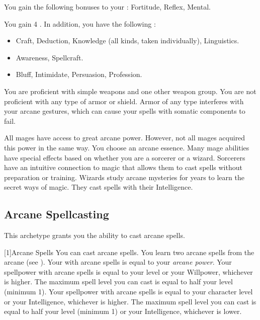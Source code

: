         You gain the following bonuses to your :  Fortitude,  Reflex,  Mental.

        You gain 4 .
        In addition, you have the following :
        \begin{itemize}
            \item {} Craft, Deduction, Knowledge (all kinds, taken individually), Linguistics.
            \item {} Awareness, Spellcraft.
            \item {} Bluff, Intimidate, Persuasion, Profession.
        \end{itemize}

        You are proficient with simple weapons and one other weapon group.
        You are not proficient with any type of armor or shield.
        Armor of any type interferes with your arcane gestures, which can cause your spells with somatic components to fail.

        All mages have access to great arcane power.
        However, not all mages acquired this power in the same way.
        You choose an arcane essence.
        Many mage abilities have special effects based on whether you are a sorcerer or a wizard.
         Sorcerers have an intuitive connection to magic that allows them to cast spells without preparation or training.
         Wizards study arcane mysteries for years to learn the secret ways of magic.
        They cast spells with their Intelligence.

    \subsection{Arcane Spellcasting}
        This archetype grants you the ability to cast arcane spells.

        [1]{Arcane Spells}
        You can cast arcane spells.
        You learn two arcane spells from the arcane  (see ).
        Your  with arcane spells is equal to your \textit{arcane power}.
         Your spellpower with arcane spells is equal to your level or your Willpower, whichever is higher.
        The maximum spell level you can cast is equal to half your level (minimum 1).
         Your spellpower with arcane spells is equal to your character level or your Intelligence, whichever is higher.
        The maximum spell level you can cast is equal to half your level (minimum 1) or your Intelligence, whichever is lower.

